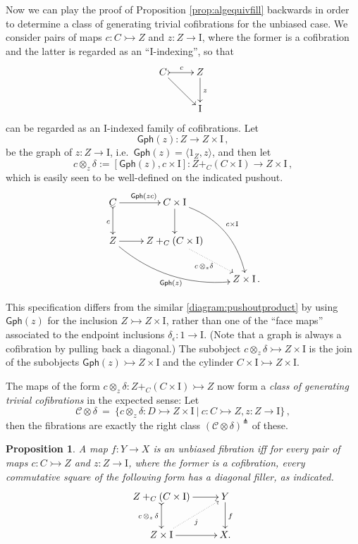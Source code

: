 \documentclass[11pt]{article}
\newcommand{\mono}{\ensuremath{\rightarrowtail}}
\newcommand{\I}{\ensuremath{\mathrm{I}}}
\newtheorem{proposition}[theorem]{Proposition}
\theoremstyle{remark}
\theoremstyle{definition}
\begin{document}
Now we can play the proof of Proposition \ref{prop:algequivfill} backwards in order to determine a class of generating trivial cofibrations for the unbiased case. We consider pairs of maps $c : C\mono Z$ and $z:Z\to\I$, where the former is a cofibration and the latter is regarded as an ``$\I$-indexing'', so that
\[
\xymatrix{
C \ar[rd] \ar@{>->}[r]^{c} & Z  \ar[d]^z \\
& \I
}
\]
can be regarded as an $\I$-indexed family of cofibrations.  Let 
\[
\mathsf{Gph}(z) : Z\to Z\times\I\,,
\]
be the graph of $z : Z\to \I$, i.e.\ $\mathsf{Gph}(z) = \langle 1_Z, z\rangle$, and then let
\[
c \otimes_z\!\delta := [\mathsf{Gph}(z), c\times\I] : Z+_C(C\times\I) \to Z\times \I\,,
\]
which is easily seen to be well-defined on the indicated pushout.
\begin{equation}\label{diagram:unbiasedpushoutproduct}
\xymatrix{
C \ar@{>->}[d]_{c} \ar[r]^{\mathsf{Gph}(zc)} & C\times \I \ar[d] \ar@/^4ex/ [rdd]^{c\times\I}\\
Z \ar@/_4ex/ [rrd]_{\mathsf{Gph}(z)} \ar[r] &  Z +_C (C\times\I) \ar@{.>}[rd]_{c\, \otimes_z \delta} \\
&& Z\times\I\,.
}
\end{equation}

This specification differs from the similar \eqref{diagram:pushoutproduct} by using $\mathsf{Gph}(z)$ for the inclusion $Z\mono Z\times\I$, rather than one of the ``face maps'' associated to the endpoint inclusions $\delta_\epsilon : 1\to\I$. (Note that a graph is always a cofibration by pulling back a diagonal.)  The subobject $c \otimes_z\!\delta \mono Z\times \I$ is the join of the subobjects $\mathsf{Gph}(z) \mono Z\times \I$ and the cylinder $C\times \I \mono Z\times \I$.

The maps of the form $c\otimes_z\delta : Z +_C (C\times\I) \mono Z$  now form a \emph{class of generating trivial cofibrations} in the expected sense: Let 
\[
\mathcal{C}\otimes\delta\ =\ \{ c \otimes_z \delta : D \mono Z \times \I\ |\ c : C\mono Z, z:Z\to\I \}\,,
\]
then the fibrations are exactly the right class $(\mathcal{C}\otimes\delta)^{\pitchfork}$ of these.
\begin{proposition}
A map $f: Y\to X$ is an unbiased  fibration iff for every pair of maps $c : C\mono Z$ and $z:Z\to\I$, where the former is a cofibration, every commutative square of the following form has a diagonal filler, as indicated.
\begin{equation}\label{diagram:unbiasedfibration}
\xymatrix{
Z +_C (C\times\I) \ar@{>->}[d]_{c\, \otimes_z\, \delta} \ar[r] & Y \ar[d]^f \\
Z\times \I \ar@{.>}[ru]_{j} \ar[r] & X.
}
\end{equation}
\end{proposition}
\end{document}
